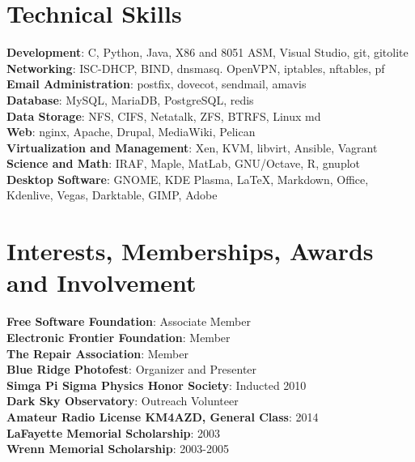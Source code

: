 \documentclass[letterpaper,11pt]{article}
\begin{document}
\section{Technical Skills}
 \begin{itemize}[leftmargin=0.15in, label={}]
    \small{\item{
     \textbf{Development}{: C, Python, Java, X86 and 8051 ASM, Visual Studio, git, gitolite} \\
     \textbf{Networking}{: ISC-DHCP, BIND, dnsmasq. OpenVPN, iptables, nftables, pf} \\
     \textbf{Email Administration}{: postfix, dovecot, sendmail, amavis} \\
     \textbf{Database}{: MySQL, MariaDB, PostgreSQL, redis} \\
     \textbf{Data Storage}{: NFS, CIFS, Netatalk, ZFS, BTRFS, Linux md} \\
     \textbf{Web}{: nginx, Apache, Drupal, MediaWiki, Pelican} \\
     \textbf{Virtualization and Management}{: Xen, KVM, libvirt, Ansible, Vagrant  } \\
     \textbf{Science and Math}{: IRAF, Maple, MatLab, GNU/Octave, R, gnuplot} \\
     \textbf{Desktop Software}{: GNOME, KDE Plasma, \LaTeX, Markdown, Office, Kdenlive, Vegas, Darktable, GIMP, Adobe} 
    }}
 \end{itemize}

\section{Interests, Memberships, Awards and Involvement }
\begin{itemize}[leftmargin=0.15in, label={}]
	\small{\item{
			\textbf{Free Software Foundation}{: Associate Member} \\
			\textbf{Electronic Frontier Foundation}{:  Member} \\
			\textbf{The Repair Association}{: Member} \\
			\textbf{Blue Ridge Photofest}{: Organizer and Presenter} \\
			\textbf{Simga Pi Sigma Physics Honor Society}{: Inducted 2010} \\
         	\textbf{Dark Sky Observatory}{: Outreach Volunteer} \\
         	\textbf{Amateur Radio License KM4AZD, General Class}{: 2014} \\
         	\textbf{LaFayette Memorial Scholarship}{: 2003} \\
         	\textbf{Wrenn Memorial Scholarship}{: 2003-2005} \\
	}}
\end{itemize}


%


\end{document}
